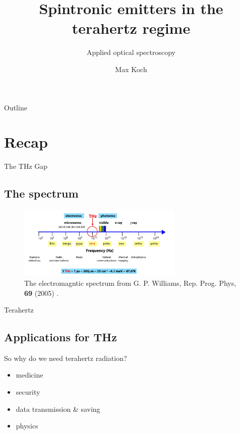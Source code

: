 \documentclass[aspectratio=1610, 9pt]{beamer}
\title{Spintronic emitters in the terahertz regime}
\subtitle{Applied optical spectroscopy}
\author[M.~Koch]{Max Koch}
\institute[]{TU Dortmund \\  Fakultät Physik}
\begin{document}
\maketitle

\begin{frame}{Outline}
  \tableofcontents
\end{frame}


\section{Recap}

\begin{frame}{The THz Gap}
  \subsection{The spectrum}
  \begin{center}
    \begin{figure}
      \includegraphics[width=0.7\textwidth]{images/spectrum.png}
      \caption{\textcolor{tugreen}{The electromagntic spectrum} from G. P. Williams, Rep. Prog. Phys, \textbf{69} (2005) .}
      \nocite{spectrum_pic}
    \end{figure}
  \end{center}
\end{frame}


\begin{frame}{Terahertz}
  \subsection{Applications for THz}
  \begin{center}
    \begin{minipage}[c]{0.5\linewidth}
      So why do we need terahertz radiation?
      \vspace{0.2in}
      \begin{itemize}
        \item medicine \nocite{THzgap_applications}
        \vspace{0.1in}
        \item security \nocite{thz_explosive_detec}
        \vspace{0.1in}
        \item data transmission \& saving \nocite{communication,datasaving}
        \vspace{0.1in}
        \item physics \nocite{wiki_book}
      \end{itemize}
    \end{minipage}
\end{center}
\end{frame}
\end{document}
